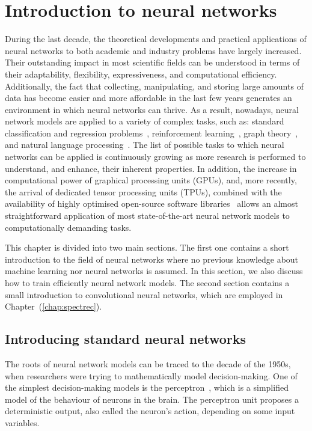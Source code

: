\chapter{Introduction to neural networks}\label{chap:neural_networks}
During the last decade, the theoretical developments and practical applications of neural networks
to both academic and industry problems have largely increased. Their outstanding impact in most
scientific fields can be understood in terms of their adaptability, flexibility, expressiveness, and
computational efficiency. Additionally, the fact that collecting, manipulating, and storing large
amounts of data has become easier and more affordable in the last few years generates an environment
in which neural networks can thrive. As a result, nowadays, neural network models are applied to a
variety of complex tasks, such as: standard classification and regression
problems~\cite{wan1990neural, feraud2002methodology}, reinforcement
learning~\cite{ReinforcementOverview, ReinforcementOverview2}, graph theory~\cite{Wu_2021}, and
natural language processing~\cite{NLPIntro, NLPIntro2}. The list of possible tasks to which neural
networks can be applied is continuously growing as more research is performed to understand, and
enhance, their inherent properties. In addition, the increase in computational power of graphical
processing units (GPUs), and, more recently, the arrival of dedicated tensor processing units
(TPUs), combined with the availability of highly optimised open-source software
libraries~\cite{PyTorch, Keras, tensorflow2015} allows an almost straightforward application of most
state-of-the-art neural network models to computationally demanding tasks.

This chapter is divided into two main sections. The first one contains a short introduction to the
field of neural networks where no previous knowledge about machine learning nor neural networks is
assumed. In this section, we also discuss how to train efficiently neural network models. The second
section contains a small introduction to convolutional neural networks, which are employed in
Chapter~(\ref{chap:spectrec}).

\section{Introducing standard neural networks}
The roots of neural network models can be traced to the decade of the 1950s, when researchers were
trying to mathematically model decision-making. One of the simplest decision-making models is the
perceptron~\cite{rosenblatt1958perceptron}, which is a simplified model of the behaviour of neurons
in the brain. The perceptron unit proposes a deterministic output, also called the neuron's action,
depending on some input variables.

